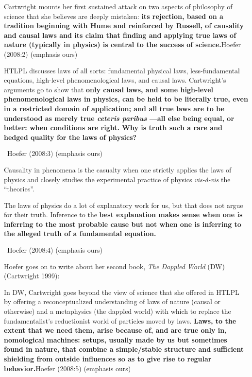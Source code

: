 \begin{myquote}
Cartwright mounts her first sustained attack on two aspects of philosophy of science that she believes are deeply mistaken: \textbf{its rejection, based on a tradition beginning with Hume and reinforced by Russell, of causality and causal laws and its claim that finding and applying true laws of nature (typically in physics) is central to the success of science.}\hfill Hoefer (2008:2) (emphasis ours)
\end{myquote}

\begin{myquote}
HTLPL discusses laws of all sorts: fundamental physical laws, less-fundamental equations, high-level phenomenological laws, and causal laws. Cartwright’s arguments go to show that \textbf{only causal laws, and some high-level phenomenological laws in physics, can be held to be literally true, even in a restricted domain of application; and all true laws are to be understood as merely true \textit{ceteris paribus} —all else being equal, or better: when conditions are right. Why is truth such a rare and hedged quality for the laws of physics?}

~\hfill Hoefer (2008:3) (emphasis ours)
\end{myquote}

Causality in phenomena is the casualty when one strictly applies the laws of physics and closely studies the experimental practice of physics \textit{vis-à-vis} the “theories”.

\begin{myquote}
The laws of physics do a lot of explanatory work for us, but that does not argue for their truth. Inference to the \textbf{best explanation makes sense when one is inferring to the most probable cause but not when one is inferring to the alleged truth of a fundamental equation.}

~\hfill Hoefer (2008:4) (emphasis ours)
\end{myquote}

Hoefer goes on to write about her second book, \textit{The Dappled World} (DW)(Cartwright 1999):

\begin{myquote}
In DW, Cartwright goes beyond the view of science that she offered in HTLPL by offering a reconceptualized understanding of laws of nature (causal or otherwise) and a metaphysics (the dappled world) with which to replace the fundamentalist’s reductionist world of particles moved by laws. \textbf{Laws, to the extent that we need them, arise because of, and are true only in, nomological machines: setups, usually made by us but sometimes found in nature, that combine a simple/stable structure and sufficient shielding from outside influences so as to give rise to regular behavior.}\hfill Hoefer (2008:5) (emphasis ours)
\end{myquote}

